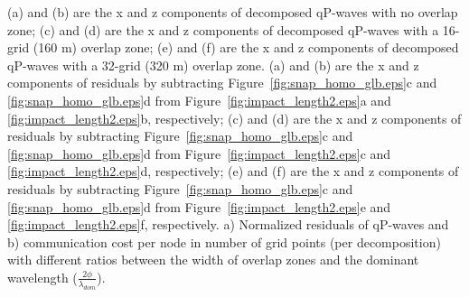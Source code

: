 \documentclass[manuscript,ulem,graphix,revised]{geophysics}
\begin{document}
 {
(a) and (b) are the x and z components of decomposed qP-waves with no overlap zone; 
(c) and (d) are the x and z components of decomposed qP-waves with a 16-grid (160 m) overlap zone; 
(e) and (f) are the x and z components of decomposed qP-waves with a 32-grid (320 m) overlap zone.
}
 {
(a) and (b) are the x and z components of residuals by subtracting Figure~\ref{fig:snap_homo_glb.eps}c and \ref{fig:snap_homo_glb.eps}d from Figure~\ref{fig:impact_length2.eps}a and \ref{fig:impact_length2.eps}b, respectively; 
(c) and (d) are the x and z components of residuals by subtracting Figure~\ref{fig:snap_homo_glb.eps}c and \ref{fig:snap_homo_glb.eps}d from Figure~\ref{fig:impact_length2.eps}c and \ref{fig:impact_length2.eps}d, respectively;
(e) and (f) are the x and z components of residuals by subtracting Figure~\ref{fig:snap_homo_glb.eps}c and \ref{fig:snap_homo_glb.eps}d from Figure~\ref{fig:impact_length2.eps}e and \ref{fig:impact_length2.eps}f, respectively.
}
{
a) Normalized residuals of qP-waves and b) communication cost per node in number of grid points (per decomposition) with different ratios between the width of overlap zones and the dominant wavelength ($\frac{2\phi}{\lambda_{dom}}$). 
}
\end{document}
